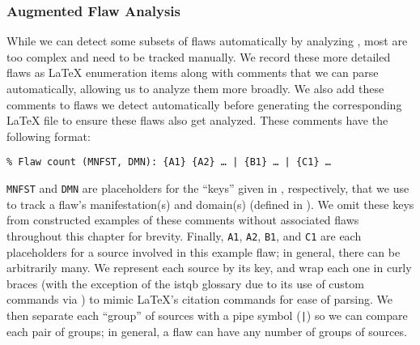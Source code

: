 \subsubsection{Augmented Flaw Analysis}
\label{aug-flaw-analysis}
While we can detect some subsets of flaws automatically by analyzing
\ourApproachGlossary, most are too complex and need to be tracked manually. We
record these more detailed flaws as \LaTeX{} enumeration items along with
comments that we can parse automatically, allowing us to analyze them more
broadly. We also add these comments to flaws we detect automatically before
generating the corresponding \LaTeX{} file to ensure these flaws also get
analyzed. These comments have the following format:
\begin{displayquote}
    \texttt{\% Flaw count (MNFST, DMN): \{A1\} \{A2\} \dots{} | \{B1\} %
        \dots{} | \{C1\} \dots}
\end{displayquote}
\texttt{MNFST} and \texttt{DMN} are placeholders for the ``keys'' given in
, respectively, that we use to track a
flaw's manifestation(s) and domain(s) (defined in ). We omit
these keys from constructed examples of these comments without associated flaws
throughout this chapter for brevity. Finally, \texttt{A1}, \texttt{A2}, %
\texttt{B1}, and \texttt{C1} are each placeholders for a source involved in
this example flaw; in general, there can be arbitrarily many. We represent each
source by its \BibTeX{} key, and wrap each one in curly braces (with the
exception of the \acs{istqb} glossary due to its use of custom commands via
) to mimic \LaTeX{}'s citation commands for ease of parsing.
We then separate each ``group'' of sources with a pipe symbol (\texttt{|}) so
we can compare each pair of groups; in general, a flaw can have any number of
groups of sources.


